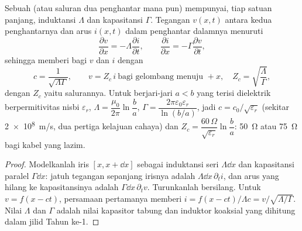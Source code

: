 \begin{proposition}\label{prop:b2:dispersion-wave-packets:coax}
Sebuah  (atau saluran dua penghantar mana pun) mempunyai, tiap satuan panjang,
induktansi $\Lambda$ dan kapasitansi $\Gamma$. Tegangan $v(x, t)$ antara
kedua penghantarnya dan arus $i(x, t)$ dalam penghantar dalamnya menuruti
\emph{}
\[
\frac{\partial v}{\partial x} = -\Lambda\frac{\partial i}{\partial t} , \qquad
\frac{\partial i}{\partial x} = -\Gamma\frac{\partial v}{\partial t} ,
\]
sehingga memberi  bagi $v$ dan $i$ dengan
\[
c = \frac1{\sqrt{\Lambda\Gamma}} , \qquad
v = Z_c\,i \ \text{bagi gelombang menuju } +x, \quad Z_c = \sqrt{\frac\Lambda\Gamma} ,
\]
dengan $Z_c$ yaitu \emph{} salurannya. Untuk
 berjari-jari $a < b$ yang terisi dielektrik berpermitivitas
nisbi $\varepsilon_r$, $\Lambda = \dfrac{\mu_0}{2\pi}\ln\dfrac ba$, $\Gamma =
\dfrac{2\pi\varepsilon_0\varepsilon_r}{\ln(b/a)}$, jadi $c = c_0/\sqrt{\varepsilon_r}$ (sekitar
\qty{2e8}{m/s}, dua pertiga kelajuan cahaya) dan $Z_c = \dfrac{60\,\Omega}
{\sqrt{\varepsilon_r}}\ln\dfrac ba$: \qty{50}{\ohm} atau \qty{75}{\ohm} bagi kabel yang lazim.
\end{proposition}

\begin{proof}
Modelkanlah iris $[x, x + \dd x]$ sebagai induktansi seri $\Lambda\dd x$ dan
kapasitansi paralel $\Gamma\dd x$: jatuh tegangan sepanjang irisnya adalah
$\Lambda\dd x\,\partial_ti$, dan arus yang hilang ke kapasitansinya adalah $\Gamma\dd x
\,\partial_tv$. Turunkanlah bersilang. Untuk $v = f(x - ct)$, persamaan pertamanya
memberi $i = f(x - ct)/\Lambda c = v/\sqrt{\Lambda/\Gamma}$. Nilai $\Lambda$ dan
$\Gamma$ adalah nilai kapasitor tabung dan induktor koaksial
yang dihitung dalam jilid Tahun ke-1.
\end{proof}

